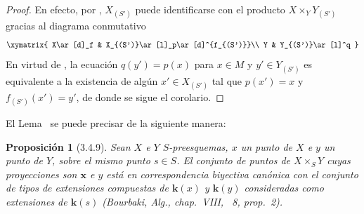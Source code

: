 \documentclass[oneside]{amsart}
\theoremstyle{ega-env-style}
\theoremstyle{ega-thm-env-style}
\newtheorem*{proposition}{Proposición}
\theoremstyle{ega-defn-env-style}
\newcommand{\oldpage}[2][]{{\marginnote{\normalfont{\textbf{#1}~|~#2}}}\ignorespaces}
\let\EGAOriginalLabel\label
\renewcommand{\label}[1]{\phantomsection\EGAOriginalLabel{#1}}
\begin{document}
\oldpage[I]{114}
\begin{proof}
En efecto, por , $X_{(S')}$ puede identificarse con el producto $X\times_Y Y_{(S')}$ gracias al diagrama conmutativo
\label{I.3.4.8.proof-diagram-fr}
\[
  \xymatrix{
    X\ar[d]_f & X_{(S')}\ar[l]_p\ar[d]^{f_{(S')}}\\
    Y & Y_{(S')}\ar[l]^q
  }
\]
En virtud de , la ecuación $q(y')=p(x)$ para $x\in M$ y $y'\in Y_{(S')}$ es equivalente a la existencia de algún $x'\in X_{(S')}$ tal que $p(x')=x$ y $f_{(S')}(x')=y'$, de donde se sigue el corolario.
\end{proof}

El Lema~ se puede precisar de la siguiente manera:
\begin{proposition}[3.4.9]
\label{I.3.4.9}
Sean $X$ e $Y$ $S$-preesquemas, $x$ un punto de $X$ e $y$ un punto de $Y$, sobre el mismo punto $s\in S$.
El conjunto de puntos de $X\times_S Y$ cuyas proyecciones son $\boldsymbol{x}$ e $y$ está en correspondencia biyectiva canónica con el conjunto de tipos de extensiones compuestas de $\boldsymbol{k}(x)$ y $\boldsymbol{k}(y)$ consideradas como extensiones de $\boldsymbol{k}(s)$ \textup{(Bourbaki, \emph{Alg.}, chap.~VIII, \textsection~8, prop.~2)}.
\end{proposition}
\end{document}
